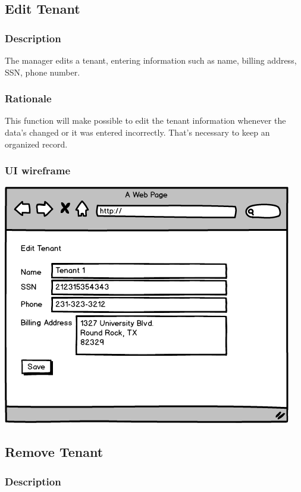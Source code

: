 \documentclass{scrreprt}
\begin{document}
\subsection{Edit Tenant}
\subsubsection{Description}

The manager edits a tenant, entering information such as name, billing address, SSN, phone number.

\subsubsection{Rationale}

This function will make possible to edit the tenant information whenever the data's changed or it was entered incorrectly. That's necessary to keep an organized record.

\subsubsection{UI wireframe}
\includegraphics[scale=0.60]{mockups/edittenant.png}

\subsection{Remove Tenant}
\subsubsection{Description}
\end{document}
